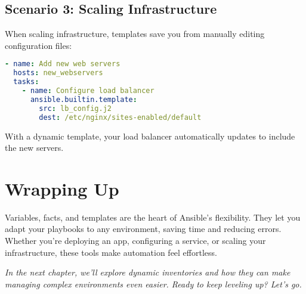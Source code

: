 \subsection{Scenario 3: Scaling Infrastructure}

When scaling infrastructure, templates save you from manually editing configuration files:
\begin{lstlisting}[language=yaml, caption=Scaling Infrastructure Playbook]
- name: Add new web servers
  hosts: new_webservers
  tasks:
    - name: Configure load balancer
      ansible.builtin.template:
        src: lb_config.j2
        dest: /etc/nginx/sites-enabled/default
\end{lstlisting}

With a dynamic template, your load balancer automatically updates to include the new servers.


\section{Wrapping Up}

Variables, facts, and templates are the heart of Ansible's flexibility. They let you adapt your playbooks to any environment, saving time and reducing errors. Whether you're deploying an app, configuring a service, or scaling your infrastructure, these tools make automation feel effortless.

\vspace{1em}

\textit{In the next chapter, we'll explore dynamic inventories and how they can make managing complex environments even easier. Ready to keep leveling up? Let's go.}
